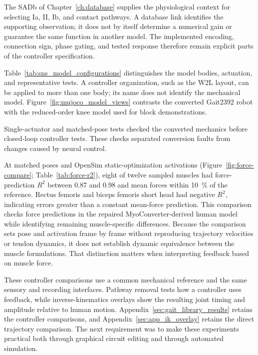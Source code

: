 The SADb of Chapter~\ref{ch:database} supplies the physiological context for selecting Ia, II, Ib, and contact pathways. A database link identifies the supporting observation; it does not by itself determine a numerical gain or guarantee the same function in another model. The implemented encoding, connection sign, phase gating, and tested response therefore remain explicit parts of the controller specification.

Table~\ref{tab:sns_model_configurations} distinguishes the model bodies, actuation, and representative tests. A controller organization, such as the W2L layout, can be applied to more than one body; its name does not identify the mechanical model. Figure~\ref{fig:mujoco_model_views} contrasts the converted Gait2392 robot with the reduced-order knee model used for block demonstrations.



Single-actuator and matched-pose tests checked the converted mechanics before closed-loop controller tests. These checks separated conversion faults from changes caused by neural control.

At matched poses and OpenSim static-optimization activations (Figure~\ref{fig:force-compare}; Table~\ref{tab:force-r2}), eight of twelve sampled muscles had force-prediction $R^2$ between 0.87 and 0.98 and mean forces within \qty{10}{\percent} of the reference. Rectus femoris and biceps femoris short head had negative $R^2$, indicating errors greater than a constant mean-force prediction. This comparison checks force predictions in the repaired MyoConverter-derived human model while identifying remaining muscle-specific differences. Because the comparison sets pose and activation frame by frame without reproducing trajectory velocities or tendon dynamics, it does not establish dynamic equivalence between the muscle formulations. That distinction matters when interpreting feedback based on muscle force.

These controller comparisons use a common mechanical reference and the same sensory and recording interfaces. Pathway removal tests how a controller uses feedback, while inverse-kinematics overlays show the resulting joint timing and amplitude relative to human motion. Appendix~\ref{sec:gait_library_results} retains the controller comparisons, and Appendix~\ref{sec:app_ik_overlay} retains the direct trajectory comparison. The next requirement was to make these experiments practical both through graphical circuit editing and through automated simulation.


